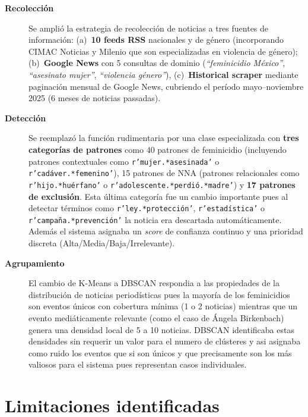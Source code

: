 \begin{description}
    \item[\textbf{Recolección}]
    Se amplió la estrategia de recolección de noticias a tres fuentes de información:
    (a)~\textbf{10 feeds RSS} nacionales y de género (incorporando CIMAC Noticias
    y Milenio que son especializadas en violencia de género);
    (b)~\textbf{Google News} con 5 consultas de dominio
    (\textit{``feminicidio México''}, \textit{``asesinato mujer''}, \textit{``violencia género''}),
    (c)~\textbf{Historical scraper} mediante paginación mensual de Google News,
    cubriendo el período mayo--noviembre 2025 (6 meses de noticias passadas).

    \item[\textbf{Detección}]
    Se reemplazó la función rudimentaria por una clase especializada con
    \textbf{tres categorías de patrones} como 40 patrones de feminicidio (incluyendo
    patrones contextuales como \texttt{r'mujer.*asesinada'} o \texttt{r'cadáver.*femenino'}),
    15 patrones de NNA (patrones relacionales como \texttt{r'hijo.*huérfano'} o \texttt{r'adolescente.*perdió.*madre'})
    y \textbf{17 patrones de exclusión}. Esta última categoría fue un cambio importante
    pues al detectar términos como \texttt{r'ley.*protección'}, \texttt{r'estadística'} o
    \texttt{r'campaña.*prevención'} la noticia era descartada automáticamente. Además
    el sistema asignaba un \textit{score} de confianza continuo y una prioridad
    discreta (Alta/Media/Baja/Irrelevante).

    \item[\textbf{Agrupamiento}]
    El cambio de K-Means a DBSCAN respondia a las propiedades de la distribución de
    noticias periodísticas pues la mayoría de los feminicidios son eventos únicos
    con cobertura mínima (1 o 2 noticias) mientras que un evento mediáticamente
    relevante (como el caso de Ángela Birkenbach) genera una densidad local de
    5 a 10 noticias. DBSCAN identificaba estas densidades sin requerir un valor
    para el numero de clústeres y asi asignaba como ruido los eventos que si son
    únicos y que precisamente son los más valiosos para el sistema pues representan
    casos individuales.
\end{description}

\section{Limitaciones identificadas}
\label{sec:limitaciones_motivacion}


